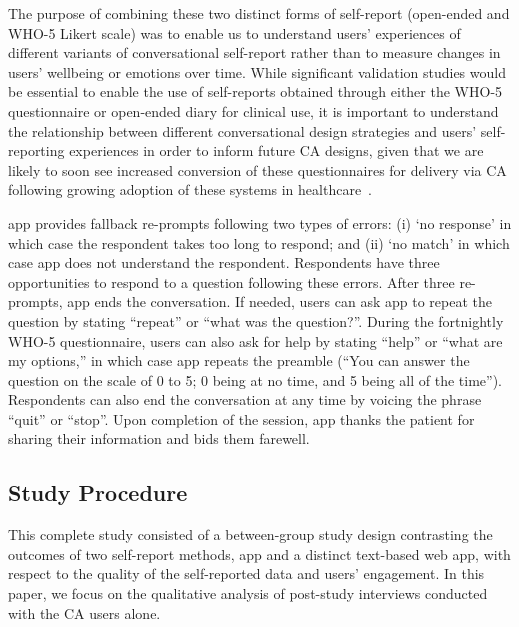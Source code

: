         The purpose of combining these two distinct forms of self-report (open-ended and \ac{WHO-5} Likert scale) was to enable us to understand users' experiences of different variants of conversational self-report rather than to measure changes in users' wellbeing or emotions over time. While significant validation studies would be essential to enable the use of self-reports obtained through either the \ac{WHO-5} questionnaire or open-ended diary for clinical use, it is important to understand the relationship between different conversational design strategies and users’ self-reporting experiences in order to inform future \ac{CA} designs, given that we are likely to soon see increased conversion of these questionnaires for delivery via \ac{CA} following growing adoption of these systems in healthcare~\cite{Voicebot2019}.

        \acl{app} provides fallback re-prompts following two types of errors: (i) `no response' in which case the respondent takes too long to respond; and (ii) `no match' in which case \acl{app} does not understand the respondent. Respondents have three opportunities to respond to a question following these errors. After three re-prompts, \acl{app} ends the conversation. If needed, users can ask \acl{app} to repeat the question by stating ``repeat'' or ``what was the question?''. During the fortnightly \ac{WHO-5} questionnaire, users can also ask for help by stating ``help'' or ``what are my options,'' in which case \acl{app} repeats the preamble (``You can answer the question on the scale of 0 to 5; 0 being at no time, and 5 being all of the time''). Respondents can also end the conversation at any time by voicing the phrase ``quit'' or ``stop''. Upon completion of the session, \acl{app} thanks the patient for sharing their information and bids them farewell. 

        
        
    \subsection{Study Procedure}
        
        This complete study consisted of a between-group study design contrasting the outcomes of two self-report methods, \acl{app} and a distinct text-based web app, with respect to the quality of the self-reported data and users' engagement. In this paper, we focus on the qualitative analysis of post-study interviews conducted with the \ac{CA} users alone. %

